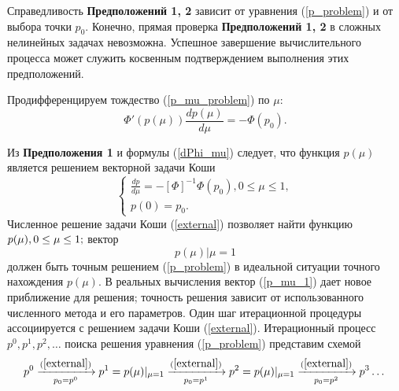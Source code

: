 Справедливость {\bf Предположений 1, 2} зависит от уравнения (\ref{p_problem}) и
от выбора точки $p_0$. Конечно, прямая проверка {\bf Предположений 1, 2} в
сложных нелинейных задачах невозможна. Успешное завершение вычислительного процесса может служить косвенным подтверждением выполнения этих предположений.

Продифференцируем тождество (\ref{p_mu_problem}) по $\mu$:
\begin{equation}
\label{dPhi_mu}
\Phi'(p(\mu))\frac{dp(\mu)}{d\mu}=-\Phi(p_0).
\end{equation}

Из {\bf Предположения 1} и формулы (\ref{dPhi_mu}) следует, что функция $p(\mu)$ является решением векторной задачи Коши
\begin {equation}
\label{external}
\begin{cases}
\frac{dp}{d\mu}=-[\Phi]^{-1}\Phi(p_0), 0\leq\mu\leq1,\\
p(0)=p_0.
\end{cases}
\end{equation}
Численное решение задачи Коши (\ref{external}) позволяет найти функцию $p(\mu),\\0\leq\mu\leq 1;$ вектор
\begin{equation}
\label{p_mu_1}
p(\mu)|{\mu=1}
\end{equation}
должен быть точным решением (\ref{p_problem}) в идеальной ситуации точного нахождения $p(\mu)$. В реальных вычисления вектор (\ref{p_mu_1}) дает новое приближение для решения; точность решения зависит от использованного численного метода и его параметров. Один шаг итерационной процедуры ассоциируется
с решением задачи Коши (\ref{external}). Итерационный процесс $p^0, p^1, p^2,\dots$ поиска решения уравнения (\ref{p_problem}) представим схемой
\begin{equation}
\label{iterative_process}
p^0\xrightarrow[p_0=p^0]{(\ref{external})}p^1=p(\mu)|_{\mu=1}\xrightarrow[p_0=p^1]{(\ref{external})}p^2=p(\mu)|_{\mu=1}\xrightarrow[p_0=p^2]{(\ref{external})}p^3\dots
\end{equation}


